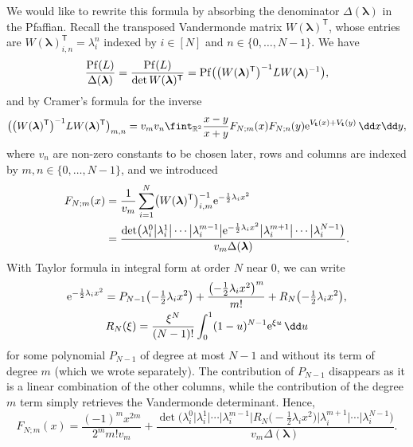 We would like to rewrite this formula by absorbing the denominator $\Delta(\boldsymbol{\lambda})$ in the Pfaffian. Recall the transposed Vandermonde matrix $W(\boldsymbol{\lambda})^{\mathsf T}$, whose entries are $W(\boldsymbol{\lambda})_{i,n}^{\mathsf T} = \lambda_i^{n}$ indexed by $i \in [N]$ and $n \in \{0,\dots,N - 1\}$. We have
\[
\frac{{\rm Pf}(L)}{\Delta(\boldsymbol{\lambda})} = \frac{{\rm Pf}(L)}{\det W(\boldsymbol{\lambda})^{\mathsf T}} = {\rm Pf}\bigl(\bigl(W(\boldsymbol{\lambda})^{\mathsf T}\bigr)^{-1} LW(\boldsymbol{\lambda})^{-1}\bigr),
\]
and by Cramer's formula for the inverse
\[
\bigl(\bigl(W(\boldsymbol{\lambda})^{\mathsf T}\bigr)^{-1} L W(\boldsymbol{\lambda})^{\mathsf T}\bigr)_{m,n} = v_mv_n\fint_{\mathbb{R}^2} \frac{x - y}{x + y} F_{N;m}(x)F_{N;n}(y) {\rm e}^{V_{\mathbf{t}}(x) + V_{\mathbf{t}}(y)}\,\dd x\dd y,
\]
where $v_n$ are non-zero constants to be chosen later, rows and columns are indexed by $m,n \in \{0,\dots,N - 1\}$, and we introduced
\begin{align*}
F_{N;m}(x) &{}= \frac{1}{v_m}\sum_{i = 1}^{N} \bigl(W(\boldsymbol{\lambda})^{\mathsf T}\bigr)^{-1}_{i,m} {\rm e}^{-\frac{1}{2}\lambda_i x^2} \\
&{}= \frac{\det\bigl(\lambda_i^0 \big| \lambda_i^1  \big| \cdots \big| \lambda_i^{m - 1} \big| {\rm e}^{-\frac{1}{2}\lambda_i x^2} \big| \lambda_i^{m + 1} \big| \cdots \big| \lambda_i^{N - 1}\bigr)}{v_m \Delta(\boldsymbol{\lambda})}.
\end{align*}
With Taylor formula in integral form at order $N$ near $0$, we can write
\begin{gather*}
{\rm e}^{-\frac{1}{2}\lambda_ix^2} = P_{N - 1}\bigl(-\tfrac{1}{2}\lambda_ix^2\bigr) + \frac{\bigl(-\frac{1}{2}\lambda_i x^2\bigr)^m}{m!} + R_{N}\bigl(-\tfrac{1}{2}\lambda_i x^2\bigr), \\
R_N(\xi) = \frac{\xi^{N}}{(N - 1)!} \int_{0}^{1}(1-u)^{N - 1} {\rm e}^{\xi u}\, \dd u
\end{gather*}
for some polynomial $P_{N - 1}$ of degree at most $N - 1$ and without its term of degree $m$ (which we wrote separately). The contribution of $P_{N - 1}$ disappears as it is a linear combination of the other columns, while the contribution of the degree $m$ term simply retrieves the Vandermonde determinant. Hence,
\[
F_{N;m}(x) = \frac{(-1)^mx^{2m}}{2^m m! v_m} + \frac{\det\bigl(\lambda_i^0  \big| \lambda_i^1  \big| \cdots \big| \lambda_i^{m - 1} \big| R_N\bigl(-\tfrac{1}{2}\lambda_ix^2\bigr) \big| \lambda_i^{m + 1} \big| \cdots \big| \lambda_i^{N - 1}\bigr)}{v_m \Delta(\boldsymbol{\lambda})}.
\]
